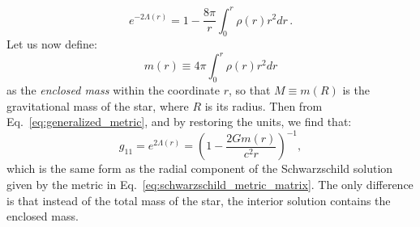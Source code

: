 \documentclass[main.tex]{subfiles}
\begin{document}
     \begin{equation}
         e^{-2\Lambda(r)} = 1 - \frac{8\pi}{r}\int_0^r\rho(r) r^2 dr\,.
     \end{equation}
     Let us now define:
     \begin{equation} \label{eq:enclosed_mass_def}
         m(r) \equiv 4\pi \int_0^r \rho(r) r^2 dr
     \end{equation}
     as the \textit{enclosed mass} within the coordinate $r$, so that $M \equiv m(R)$ is the gravitational mass of the star, where $R$ is its radius. Then from Eq.~\eqref{eq:generalized_metric}, and by restoring the units, we find that:
     \begin{equation}
         g_{11} = e^{2\Lambda(r)} = \left(1 - \frac{2Gm(r)}{c^2r}\right)^{-1},
     \end{equation}
     which is the same form as the radial component of the Schwarzschild solution given by the metric in Eq.~\eqref{eq:schwarzschild_metric_matrix}. The only difference is that instead of the total mass of the star, the interior solution contains the enclosed mass.
\end{document}

